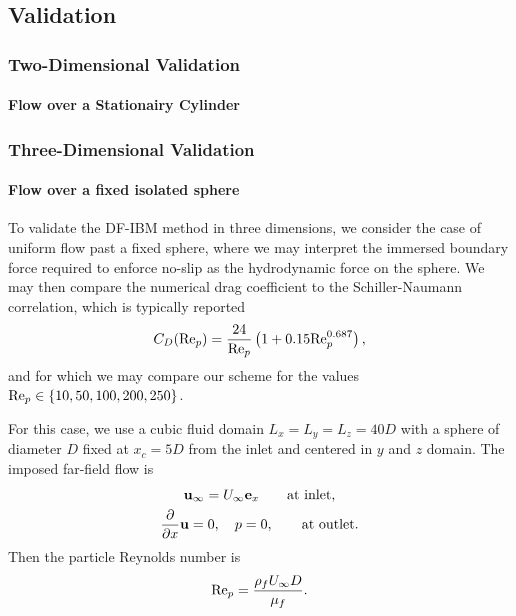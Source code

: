 \subsection{Validation}

\subsubsection{Two-Dimensional Validation}

\paragraph{Flow over a Stationairy Cylinder}

\subsubsection{Three-Dimensional Validation}

\paragraph{Flow over a fixed isolated sphere}

To validate the DF-IBM method in three dimensions, we consider the case of
uniform flow past a fixed sphere, where we may interpret the immersed boundary
force required to enforce no-slip as the hydrodynamic force on the sphere. We
may then compare the numerical drag coefficient to the Schiller-Naumann
correlation, which is typically reported \cite[84]{michaelides_multiphase_2022}
\begin{equation}
    C_D({\text {Re}}_p) = \frac{24}{{\text {Re}}_p} \left(1 + 0.15 {\text {Re}}_p^{0.687}\right),
\end{equation}
and for which we may compare our scheme for the values \({\text {Re}}_p \in \{10,50,100,200,250\}\).

For this case, we use a cubic fluid domain \(L_x = L_y = L_z = 40D\) with a
sphere of diameter \(D\) fixed at \(x_c = 5D\) from the inlet and centered in
\(y\) and \(z\) domain. The imposed far-field flow is
\begin{gather*}
    \mathbf{u}_{\infty} = U_\infty \mathbf{e}_x \qquad \text{at inlet,} \\
    \pdv*{\mathbf{u}}{x} = 0,\quad  p = 0, \qquad \text{at outlet.}
\end{gather*}
Then the particle Reynolds number is
\begin{equation*}
    {\text {Re}}_p = \frac{\rho_f U_\infty D}{\mu_f}.
\end{equation*}

